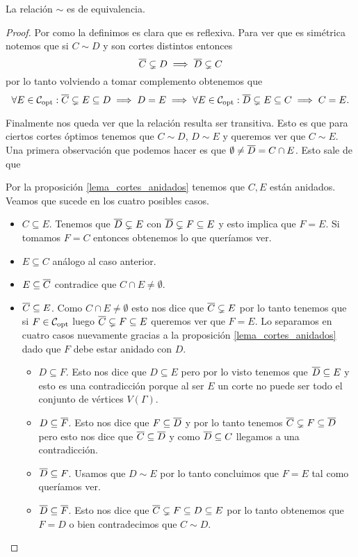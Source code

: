 \documentclass[tesis.tex]{subfiles}
\begin{document}
\begin{prop}
	La relación $\sim$ es de equivalencia.
\end{prop}
\begin{proof}
	Por como la definimos es clara que es reflexiva.
	Para ver que es simétrica notemos que si $C \sim D$ y son cortes distintos entonces  
	\[
		\overline C \subsetneq D \implies \overline D \subsetneq C
	\]
	por lo tanto volviendo a tomar complemento obtenemos que
	\[
	\forall E \in {\cal C}_{\text{opt}} : \overline C \subsetneq E \subseteq D \implies D = E \implies \forall E \in {\cal C}_{\text{opt}} : \overline D \subsetneq E \subseteq C \implies C = E.
	\]
	
	Finalmente nos queda ver que la relación resulta ser transitiva.
	Esto es que para ciertos cortes óptimos tenemos que $C \sim D$, $D \sim E$ y queremos ver que $C \sim E$.
	Una primera observación que podemos hacer es que $\emptyset \neq \overline D = C \cap E$.
	Esto sale de que  
	
	Por la proposición \ref{lema_cortes_anidados} tenemos que $C,E$ están anidados.
	Veamos que sucede en los cuatro posibles casos.
	\begin{itemize}
		\item $C \subseteq E$. 
		Tenemos que $\overline D \subsetneq E$ con $\overline D \subsetneq F \subseteq E$ y esto implica que $F=E$.
		Si tomamos $F = C$ entonces obtenemos lo que queríamos ver.
		\item $E \subseteq C$ análogo al caso anterior.
		\item $E \subseteq \overline C$ contradice que $C \cap E \neq \emptyset$.
		\item $\overline C \subseteq E$.
		Como $C \cap E \neq \emptyset$ esto nos dice que $\overline C \subsetneq E$ por lo tanto tenemos que si $F \in {\cal C}_{\text{opt}}$ luego	$\overline C \subsetneq F \subseteq E$ queremos ver que $F=E$.
		Lo separamos en cuatro casos nuevamente gracias a la proposición \ref{lema_cortes_anidados} dado que $F$ debe estar anidado con $D$.
		\begin{itemize}
			\item $D \subseteq F$.
			Esto nos dice que $D \subseteq E$ pero por lo visto tenemos que $\overline D \subseteq E$ y esto es una contradicción porque al ser $E$ un corte no puede ser todo el conjunto de vértices $V(\Gamma)$.
			\item $D \subseteq \overline F$. 
			Esto nos dice que $F \subseteq \overline D$ y por lo tanto tenemos $\overline C \subsetneq F \subseteq \overline D$ pero esto nos dice que $\overline C \subseteq \overline D$ y como $\overline D \subseteq C$ llegamos a una contradicción.
			\item $\overline D \subseteq F$.
			Usamos que $D \sim E$ por lo tanto concluimos que $F=E$ tal como queríamos ver.			
			\item $\overline D \subseteq \overline F$.
			Esto nos dice que $\overline C \subsetneq F \subseteq D \subseteq E$ por lo tanto obtenemos que $F = D$ o bien contradecimos que $C \sim D$.
		\end{itemize}
	\end{itemize}
\end{proof}
\end{document}
